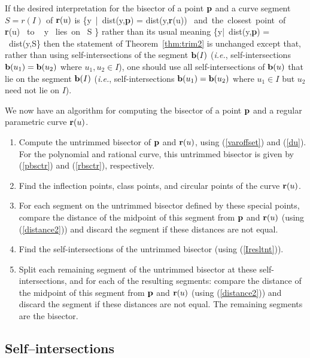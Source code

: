 \begin{rmk}
If the desired interpretation for the bisector of a point ${\bf p}$ 
and a curve segment $S = r(I)$ of ${\bf r}(u)$ is 
\be
	\{y\ |\ {\rm dist}(y,{\bf p}) = {\rm dist}(y,{\bf r}(u)) 
		{\rm \ and\ the\ closest\ point\ of\ } {\bf r}(u) 
		{\rm \ to \ } y {\rm \ lies\ on\ } S \}
\ee
rather than its usual meaning
\be
	\{y|{\rm \ dist}(y,{\bf p}) = 
	    {\rm \ dist}(y,S\}
\ee
then the statement of Theorem~\ref{thm:trim2} is unchanged except that,
rather than using self-intersections of the segment ${\bf b}(I)$ 
({\em i.e.}, self-intersections ${\bf b}(u_1) = {\bf b}(u_2)$
where $u_1, u_2 \in I$),
one should use all self-intersections of ${\bf b}(u)$ that lie on 
the segment ${\bf b}(I)$ 
({\em i.e.}, self-intersections ${\bf b}(u_1) = {\bf b}(u_2)$
where $u_1 \in I$ but $u_2$ need not lie on $I$).
\end{rmk}

We now have an algorithm for computing the bisector of a point
${\bf p}$ and a regular parametric curve ${\bf r}(u)$.

\begin{enumerate}
\item
	Compute the untrimmed bisector of ${\bf p}$ and ${\bf r}(u)$,
	using (\ref{varoffset}) and (\ref{du}).
	For the polynomial and rational curve, this untrimmed bisector
	is given by (\ref{pbsctr}) and (\ref{rbsctr}), respectively.
\item
	Find the inflection points, class points, and circular points 	
	of the curve ${\bf r}(u)$.
\item
	For each segment on the untrimmed bisector defined by these 
	special points, compare the distance of the midpoint of this
	segment from ${\bf p}$ and ${\bf r}(u)$ (using (\ref{distance2}))
	and discard the segment if these distances are not equal.
\item
	Find the self-intersections of the untrimmed bisector
	(using (\ref{Iresltnt})).
\item
	Split each remaining segment of the untrimmed bisector
	at these self-intersections, and for each of the resulting
	segments: compare the distance of the midpoint of this
	segment from ${\bf p}$ and ${\bf r}(u)$ (using (\ref{distance2}))
	and discard the segment if these distances are not equal.
	The remaining segments are the bisector.
\end{enumerate}

\subsection{Self--intersections}

